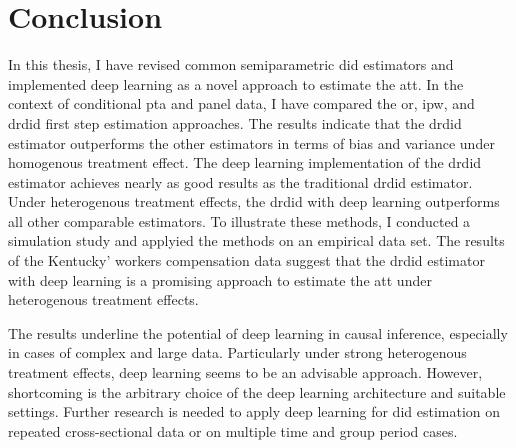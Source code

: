 \section{Conclusion}

In this thesis, I have revised common semiparametric \ac{did} estimators and implemented deep learning as a novel approach to estimate the \ac{att}.
In the context of conditional \ac{pta} and panel data, I have compared the \ac{or}, \ac{ipw}, and \ac{drdid} first step estimation approaches.
The results indicate that the \ac{drdid} estimator outperforms the other estimators in terms of bias and variance under homogenous treatment effect.
The deep learning implementation of the \ac{drdid} estimator achieves nearly as good results as the traditional \ac{drdid} estimator.
Under heterogenous treatment effects, the \ac{drdid} with deep learning outperforms all other comparable estimators.
To illustrate these methods, I conducted a simulation study and applyied the methods on an empirical data set.
The results of the Kentucky' workers compensation data suggest that the \ac{drdid} estimator with deep learning is a promising approach to estimate the \ac{att} under heterogenous treatment effects.

The results underline the potential of deep learning in causal inference, especially in cases of complex and large data.
Particularly under strong heterogenous treatment effects, deep learning seems to be an advisable approach.
However, shortcoming is the arbitrary choice of the deep learning architecture and suitable settings.
Further research is needed to apply deep learning for \ac{did} estimation on repeated cross-sectional data or on multiple time and group period cases.
